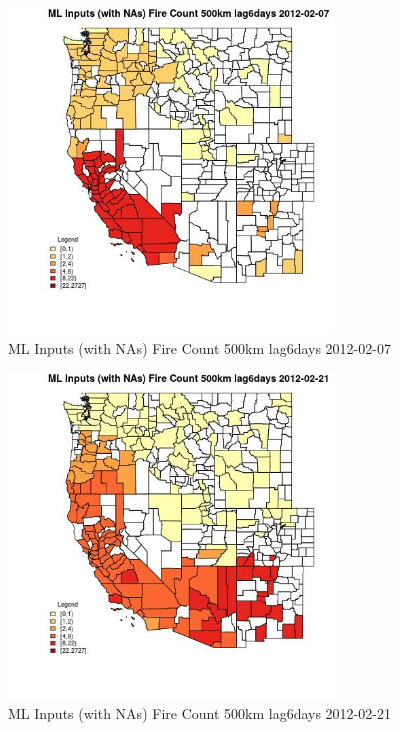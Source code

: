 \begin{figure} 
\centering  
\includegraphics[width=0.77\textwidth]{Code_Outputs/Report_ML_input_PM25_Step4_part_f_de_duplicated_aves_prioritize_24hr_obswNAs_CountyFire_Count_500km_lag6daysMean2012-02-07.jpg} 
\caption{\label{fig:Report_ML_input_PM25_Step4_part_f_de_duplicated_aves_prioritize_24hr_obswNAsCountyFire_Count_500km_lag6daysMean2012-02-07}ML Inputs (with NAs) Fire Count 500km lag6days 2012-02-07} 
\end{figure} 
 

\begin{figure} 
\centering  
\includegraphics[width=0.77\textwidth]{Code_Outputs/Report_ML_input_PM25_Step4_part_f_de_duplicated_aves_prioritize_24hr_obswNAs_CountyFire_Count_500km_lag6daysMean2012-02-21.jpg} 
\caption{\label{fig:Report_ML_input_PM25_Step4_part_f_de_duplicated_aves_prioritize_24hr_obswNAsCountyFire_Count_500km_lag6daysMean2012-02-21}ML Inputs (with NAs) Fire Count 500km lag6days 2012-02-21} 
\end{figure} 
 

